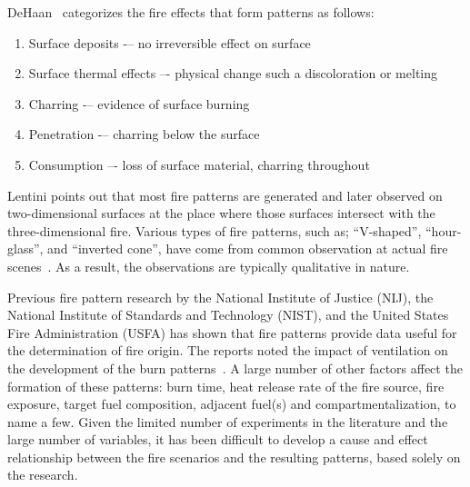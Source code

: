 \documentclass[twoside]{uocthesis}
\begin{document}
DeHaan~\cite{DeHaan:2012} categorizes the fire effects that form patterns as follows:
\begin{enumerate}
\item Surface deposits -– no irreversible effect on surface
\item Surface thermal effects –- physical change such a discoloration or melting
\item Charring -– evidence of surface burning
\item Penetration -– charring below the surface
\item Consumption –- loss of surface material, charring throughout
\end{enumerate}
Lentini points out that most fire patterns are generated and later observed on two-dimensional surfaces at the place where those surfaces intersect with the three-dimensional fire. Various types of fire patterns, such as; ``V-shaped'', ``hour-glass'', and ``inverted cone'', have come from common observation at actual fire scenes~\cite{Lentini:2006}.  As a result, the observations are typically qualitative in nature.

Previous fire pattern research by the National Institute of Justice (NIJ), the National Institute of Standards and Technology (NIST), and the United States Fire Administration (USFA) has shown that fire patterns provide data useful for the determination of fire origin.  The reports noted the impact of ventilation on the development of the burn patterns~\cite{Shanley:1997,Putorti:1997}. A large number of other factors affect the formation of these patterns: burn time, heat release rate of the fire source, fire exposure, target fuel composition, adjacent fuel(s) and compartmentalization, to name a few. Given the limited number of experiments in the literature and the large number of variables, it has been difficult to develop a cause and effect relationship between the fire scenarios and the resulting patterns, based solely on the research.  
\end{document}
